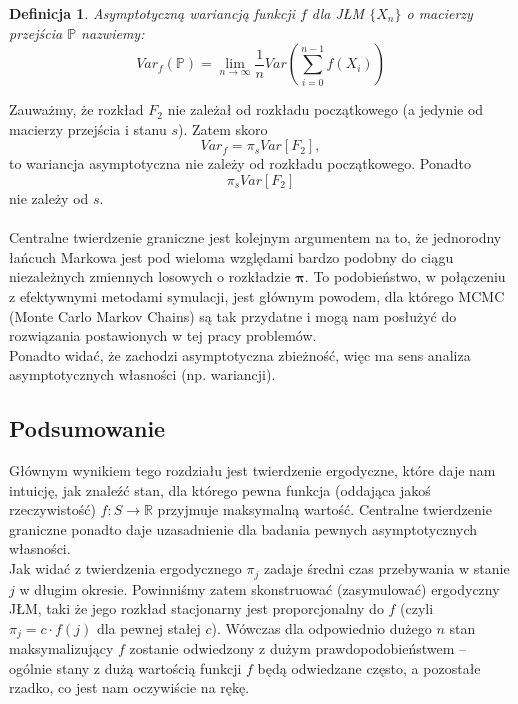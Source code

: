 \documentclass[a4paper]{article}
\theoremstyle{defn}
\newtheorem{defn}{Definicja}[subsection]
\theoremstyle{theorem}
\theoremstyle{lemma}
\theoremstyle{cor}
\theoremstyle{fact}
\begin{document}
\begin{defn}\label{defn2.6.6}
Asymptotyczną wariancją funkcji $f$ dla JŁM $\{X_n\}$ o macierzy przejścia $\mathbb{P}$ nazwiemy:
$$Var_{f}(\mathbb{P}) = \lim\limits_{n \to \infty} \frac{1}{n} Var\left(\sum\limits_{i=0}^{n-1} f(X_i)\right)$$
\end{defn}
Zauważmy, że rozkład $F_2$ nie zależał od rozkładu początkowego (a jedynie od macierzy przejścia i stanu $s$). Zatem skoro $$Var_f = \pi_s Var[F_2],$$
to wariancja asymptotyczna nie zależy od rozkładu początkowego. Ponadto
$$\pi_s Var[F_2]$$
nie zależy od $s$.\\\\
Centralne twierdzenie graniczne jest kolejnym argumentem na to, że jednorodny łańcuch Markowa jest pod wieloma względami bardzo podobny do ciągu niezależnych zmiennych losowych o rozkładzie $\boldsymbol{\pi}$. To podobieństwo, w połączeniu z efektywnymi metodami symulacji, jest głównym powodem, dla którego MCMC (Monte Carlo Markov Chains) są tak przydatne i mogą nam posłużyć do rozwiązania postawionych w tej pracy problemów.\\

Ponadto widać, że zachodzi asymptotyczna zbieżność, więc ma sens analiza asymptotycznych własności (np. wariancji).
\subsection{Podsumowanie}
\label{sect2.7}
Głównym wynikiem tego rozdziału jest twierdzenie ergodyczne, które daje nam intuicję, jak znaleźć stan, dla którego pewna funkcja (oddająca jakoś rzeczywistość) $f: S \rightarrow \mathbb{R}$ przyjmuje maksymalną wartość. Centralne twierdzenie graniczne ponadto daje uzasadnienie dla badania pewnych asymptotycznych własności.\\

Jak widać z twierdzenia ergodycznego $\pi_j$ zadaje średni czas przebywania w stanie $j$ w długim okresie. Powinniśmy zatem skonstruować (zasymulować) ergodyczny JŁM, taki że jego rozkład stacjonarny jest proporcjonalny do $f$ (czyli $\pi_j = c \cdot f(j)$ dla pewnej stałej $c$). Wówczas dla odpowiednio dużego $n$ stan maksymalizujący $f$ zostanie odwiedzony z dużym prawdopodobieństwem – ogólnie stany z dużą wartością funkcji $f$ będą odwiedzane często, a pozostałe rzadko, co jest nam oczywiście na rękę.
\\
\end{document}
